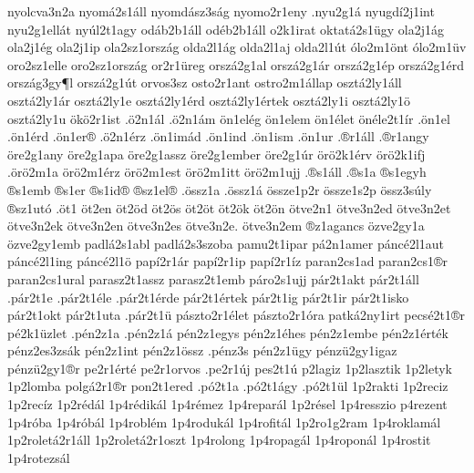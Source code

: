 {nyolcva3n2a
nyom^^e12s1^^e1ll
nyomd^^e1sz3s^^e1g
nyomo2r1eny
.nyu2g1^^e1
nyugd^^ed2j1int
nyu2g1ell^^e1t
ny^^fal2t1agy
od^^e1b2b1^^e1ll
od^^e9b2b1^^e1ll
o2k1irat
oktat^^e12s1^^fcgy
ola2j1^^e1g
ola2j1^^e9g
ola2j1ip
ola2sz1orsz^^e1g
olda2l1^^e1g
olda2l1aj
olda2l1^^fat
^^f3lo2m1^^f6nt
^^f3lo2m1^^fcv
oro2sz1elle
oro2sz1orsz^^e1g
or2r1^^fcreg
orsz^^e12g1al
orsz^^e12g1^^e1r
orsz^^e12g1^^e9p
orsz^^e12g1^^e9rd
orsz^^e1g3gy^^b6l
orsz^^e12g1^^fat
orvos3sz
osto2r1ant
ostro2m1^^e1llap
oszt^^e12ly1^^e1ll
oszt^^e12ly1^^e1r
oszt^^e12ly1e
oszt^^e12ly1^^e9rd
oszt^^e12ly1^^e9rtek
oszt^^e12ly1i
oszt^^e12ly1^^f6
oszt^^e12ly1u
^^f6k^^f62r1ist
.^^f62n1^^e1l
.^^f62n1^^e1m
^^f6n1el^^e9g
^^f6n1elem
^^f6n1^^e9let
^^f6n^^e9le2t1^^edr
.^^f6n1el
.^^f6n1^^e9rd
.^^f6n1er^^ae
.^^f62n1^^e9rz
.^^f6n1im^^e1d
.^^f6n1ind
.^^f6n1ism
.^^f6n1ur
.^^aer1^^e1ll
.^^aer1angy
^^f6re2g1any
^^f6re2g1apa
^^f6re2g1assz
^^f6re2g1ember
^^f6re2g1^^far
^^f6r^^f62k1^^e9rv
^^f6r^^f62k1ifj
.^^f6r^^f62m1a
^^f6r^^f62m1^^e9rz
^^f6r^^f62m1est
^^f6r^^f62m1itt
^^f6r^^f62m1ujj
.^^aes1^^e1ll
.^^aes1a
^^aes1egyh
^^aes1emb
^^aes1er
^^aes1id^^ae
^^aesz1el^^ae
.^^f6ssz1a
.^^f6ssz1^^e1
^^f6ssze1p2r
^^f6ssze1s2p
^^f6ssz3s^^faly
^^aesz1ut^^f3
.^^f6t1
^^f6t2en
^^f6t2^^f6d
^^f6t2^^f6s
^^f6t2^^f6t
^^f6t2^^f6k
^^f6t2^^f6n
^^f6tve2n1
^^f6tve3n2ed
^^f6tve3n2et
^^f6tve3n2ek
^^f6tve3n2en
^^f6tve3n2es
^^f6tve3n2e.
^^f6tve3n2em
^^aez1agancs
^^f6zve2gy1a
^^f6zve2gy1emb
padl^^e12s1abl
padl^^e12s3szoba
pamu2t1ipar
p^^e12n1amer
p^^e1nc^^e92l1aut
p^^e1nc^^e92l1ing
p^^e1nc^^e92l1^^f6
pap^^ed2r1^^e1r
pap^^ed2r1ip
pap^^ed2r1^^edz
paran2cs1ad
paran2cs1^^aer
paran2cs1ural
parasz2t1assz
parasz2t1emb
p^^e1ro2s1ujj
p^^e1r2t1akt
p^^e1r2t1^^e1ll
.p^^e1r2t1e
.p^^e1r2t1^^e9le
.p^^e1r2t1^^e9rde
p^^e1r2t1^^e9rtek
p^^e1r2t1ig
p^^e1r2t1ir         %
p^^e1r2t1isko
p^^e1r2t1okt
p^^e1r2t1uta
.p^^e1r2t1^^fc
p^^e1szto2r1^^e9let
p^^e1szto2r1^^f3ra
patk^^e12ny1irt
pecs^^e92t1^^aer
p^^e92k1^^fczlet
.p^^e9n2z1a
.p^^e9n2z1^^e1
p^^e9n2z1egys
p^^e9n2z1^^e9hes
p^^e9n2z1embe
p^^e9n2z1^^e9rt^^e9k
p^^e9nz2es3zs^^e1k
p^^e9n2z1int
p^^e9n2z1^^f6ssz
.p^^e9nz3s
p^^e9n2z1^^fcgy
p^^e9nz^^fc2gy1igaz
p^^e9nz^^fc2gy1^^aer
pe2r1^^e9rt^^e9
pe2r1orvos
.pe2r1^^faj
pes2t1^^fa
p2lagiz
1p2lasztik
1p2letyk
1p2lomba
polg^^e12r1^^aer
pon2t1ered
.p^^f32t1a
.p^^f32t1^^e1gy
.p^^f32t1^^fcl
1p2rakti
1p2reciz
1p2rec^^edz
1p2r^^e9d^^e1l
1p4r^^e9dik^^e1l
1p4r^^e9mez
1p4repar^^e1l
1p2r^^e9sel
1p4resszio
p4rezent
1p4r^^f3ba
1p4r^^f3b^^e1l
1p4robl^^e9m
1p4roduk^^e1l
1p4rofit^^e1l
1p2ro1g2ram
1p4roklam^^e1l
1p2rolet^^e12r1^^e1ll
1p2rolet^^e12r1oszt
1p4rolong
1p4ropag^^e1l
1p4ropon^^e1l
1p4rostit
1p4rotezs^^e1l
}
